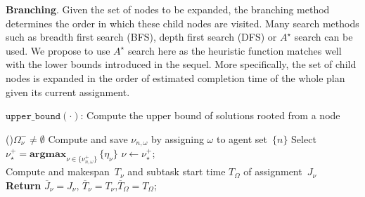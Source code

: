 \textbf{Branching}.
Given the set of nodes to be expanded,
the branching method determines the order in which these child nodes are
visited.
Many search methods such as breadth first search (BFS), depth first search (DFS)
or $A^\star$ search can be used.
We propose to use $A^\star$ search here as the heuristic function matches well
with the lower bounds introduced in the sequel.
More specifically, the set of child nodes is expanded in the order of
estimated completion time of the whole plan given its current assignment.

\begin{algorithm}[t]
\caption{$\texttt{upper\_bound}(\cdot)$: Compute the upper bound of solutions
rooted from a node}
\label{alg:upper_bound}
\While(\tcp*[f]{\eqref{eq:node-tasks}}){$\Omega^-_\nu \neq \emptyset$}{
{Compute and save $\nu_{n,\omega}$ by assigning $\omega$ to agent set~$\{n\}$ }
Select~$\nu^{+}_{\star}=\textbf{argmax}_{\nu\in \{\nu_{n,\omega}^+\}}\,\{\eta_{\nu}\}$
\label{algline:compute-eta}\tcp*{\eqref{eq:node-makespan}}
$\nu \leftarrow \nu^{+}_{\star}$; \label{algline:expand-node}\\
}
Compute and makespan~$T_\nu$ and subtask start time $T_\Omega$ of assignment~$J_\nu$ \\
\label{algline:return}
\textbf{Return} $\overline{J}_\nu=J_\nu,\, \overline{T}_\nu=T_\nu$,$\overline{T}_\Omega=T_\Omega$;\\
\end{algorithm}

